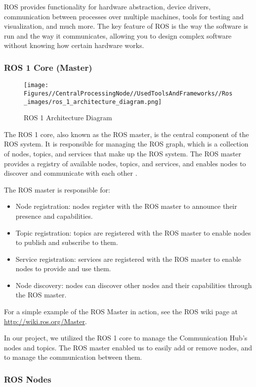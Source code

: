 ROS provides functionality for hardware abstraction, device drivers, communication between processes over multiple machines, tools for testing and visualization, and much more. The key feature of ROS is the way the software is run and the way it communicates, allowing you to design complex software without knowing how certain hardware works.
\subsubsection{ROS 1 Core (Master)}
\begin{figure}[h]
\centering
\texttt{[image: Figures//CentralProcessingNode//UsedToolsAndFrameworks//Ros\_images/ros\_1\_architecture\_diagram.png]}
\caption{ROS 1 Architecture Diagram}
\end{figure}

The ROS 1 core, also known as the ROS master, is the central component of the ROS system. It is responsible for managing the ROS graph, which is a collection of nodes, topics, and services that make up the ROS system. The ROS master provides a registry of available nodes, topics, and services, and enables nodes to discover and communicate with each other \cite{fairchild2016ros}.

The ROS master is responsible for:

\begin{itemize}
\item Node registration: nodes register with the ROS master to announce their presence and capabilities.
\item Topic registration: topics are registered with the ROS master to enable nodes to publish and subscribe to them.
\item Service registration: services are registered with the ROS master to enable nodes to provide and use them.
\item Node discovery: nodes can discover other nodes and their capabilities through the ROS master.
\end{itemize}

For a simple example of the ROS Master in action, see the ROS wiki page at \url{http://wiki.ros.org/Master}.

In our project, we utilized the ROS 1 core to manage the Communication Hub's nodes and topics. The ROS master enabled us to easily add or remove nodes, and to manage the communication between them.

\subsubsection{ROS Nodes}

